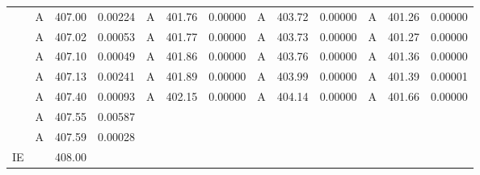 \documentclass[journal=jctcce,manuscript=article]{achemso}
\begin{document}
\begin{table}
\begin{tabular}{l|lcc|lcc|lcc|lcc}
& A & 407.00 & 0.00224 & A & 401.76 & 0.00000 & A & 403.72 & 0.00000 & A & 401.26 & 0.00000 \\
& A & 407.02 & 0.00053 & A & 401.77 & 0.00000 & A & 403.73 & 0.00000 & A & 401.27 & 0.00000 \\
& A & 407.10 & 0.00049 & A & 401.86 & 0.00000 & A & 403.76 & 0.00000 & A & 401.36 & 0.00000 \\
& A & 407.13 & 0.00241 & A & 401.89 & 0.00000 & A & 403.99 & 0.00000 & A & 401.39 & 0.00001 \\
& A & 407.40 & 0.00093 & A & 402.15 & 0.00000 & A & 404.14 & 0.00000 & A & 401.66 & 0.00000 \\
& A & 407.55 & 0.00587 &&&                    &&&                    &&&                    \\
& A & 407.59 & 0.00028 &&&                    &&&                    &&&                    \\

\hline
IE & & 408.00 
  \\
\hline
  \end{tabular}
\end{table}
%
\end{document}
